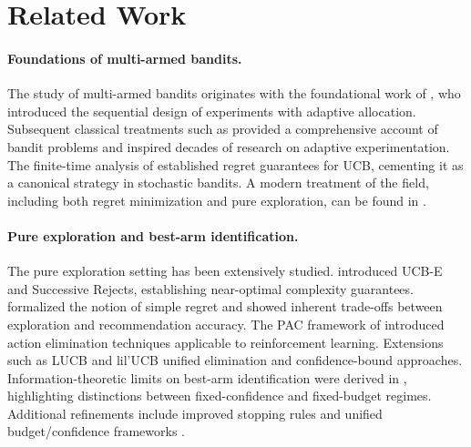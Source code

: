 \documentclass{article}
\begin{document}






\appendix



\section{Related Work}\label{sec:related-work}

\paragraph{Foundations of multi-armed bandits.}
The study of multi-armed bandits originates with the foundational work of \cite{robbins1952some}, who introduced the sequential design of experiments with adaptive allocation. Subsequent classical treatments such as \cite{berry1985bandit} provided a comprehensive account of bandit problems and inspired decades of research on adaptive experimentation. The finite-time analysis of \cite{auer2002finite} established regret guarantees for UCB, cementing it as a canonical strategy in stochastic bandits. A modern treatment of the field, including both regret minimization and pure exploration, can be found in \cite{lattimore2020bandit}.

\paragraph{Pure exploration and best-arm identification.}
The pure exploration setting has been extensively studied. \cite{audibert2010best} introduced UCB-E and Successive Rejects, establishing near-optimal complexity guarantees. \cite{bubeck2009pure} formalized the notion of simple regret and showed inherent trade-offs between exploration and recommendation accuracy. The PAC framework of \cite{even2006action} introduced action elimination techniques applicable to reinforcement learning. Extensions such as LUCB and lil'UCB \citep{kalyanakrishnan2012pac, jamieson2014best} unified elimination and confidence-bound approaches. Information-theoretic limits on best-arm identification were derived in \citep{kaufmann2013information, kaufmann2016complexity}, highlighting distinctions between fixed-confidence and fixed-budget regimes. Additional refinements include improved stopping rules \citep{garivier2019non} and unified budget/confidence frameworks \citep{gabillon2012best}.
\end{document}
